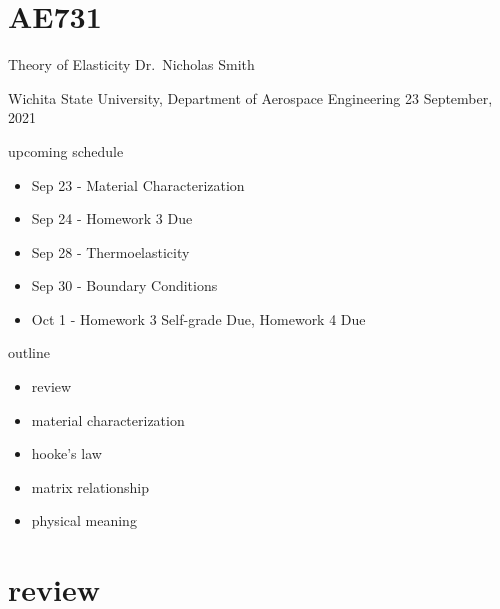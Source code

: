 \documentclass[
  letterpaper,
  ignorenonframetext,
  aspectratio=43,
  handout,
  12pt]{beamer}
\author{}
\date{}
\providecommand{\tightlist}{%
  \setlength{\itemsep}{0pt}\setlength{\parskip}{0pt}}
\providecommand{\tightlist}{%
\setlength{\itemsep}{0pt}\setlength{\parskip}{0pt}}
\begin{document}
\hypertarget{ae731}{%
\section{AE731}\label{ae731}}

\begin{frame}{Theory of Elasticity}
\protect\hypertarget{theory-of-elasticity}{}
Dr.~Nicholas Smith

Wichita State University, Department of Aerospace Engineering 23
September, 2021
\end{frame}

\begin{frame}{upcoming schedule}
\protect\hypertarget{upcoming-schedule}{}
\begin{itemize}
\tightlist
\item
  Sep 23 - Material Characterization
\item
  Sep 24 - Homework 3 Due
\item
  Sep 28 - Thermoelasticity
\item
  Sep 30 - Boundary Conditions
\item
  Oct 1 - Homework 3 Self-grade Due, Homework 4 Due
\end{itemize}
\end{frame}

\begin{frame}{outline}
\protect\hypertarget{outline}{}
\begin{itemize}
\tightlist
\item
  review
\item
  material characterization
\item
  hooke's law
\item
  matrix relationship
\item
  physical meaning
\end{itemize}
\end{frame}

\hypertarget{review}{%
\section{review}\label{review}}
\end{document}
